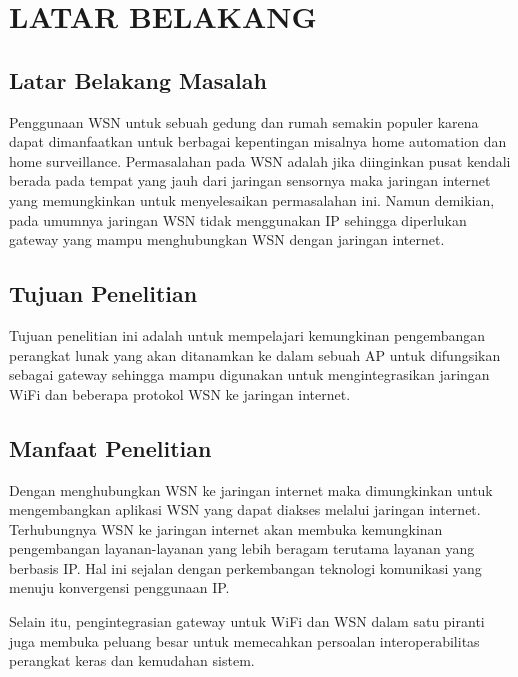 \documentclass{jtetiproposalskripsi}
\begin{document}
\tableofcontents
{}
\clearpage{}\setcounter{page}{1}

\chapter{LATAR BELAKANG}

\section{Latar Belakang Masalah}
Penggunaan WSN untuk sebuah gedung dan rumah semakin populer karena dapat dimanfaatkan untuk berbagai kepentingan misalnya home automation dan home surveillance. Permasalahan pada WSN adalah jika diinginkan pusat kendali berada pada tempat yang jauh dari jaringan sensornya maka jaringan internet yang memungkinkan untuk menyelesaikan permasalahan ini. Namun demikian, pada umumnya jaringan WSN tidak menggunakan IP sehingga diperlukan gateway yang mampu menghubungkan WSN dengan jaringan internet.

\section{Tujuan Penelitian}
Tujuan penelitian ini adalah untuk mempelajari kemungkinan pengembangan perangkat lunak yang akan ditanamkan ke dalam sebuah AP untuk difungsikan sebagai gateway sehingga mampu digunakan untuk mengintegrasikan jaringan WiFi dan beberapa protokol WSN ke jaringan internet.


\section{Manfaat Penelitian}
Dengan menghubungkan WSN ke jaringan internet maka dimungkinkan untuk mengembangkan aplikasi WSN yang dapat diakses melalui jaringan internet. Terhubungnya WSN ke jaringan internet akan membuka kemungkinan pengembangan layanan-layanan yang lebih beragam terutama layanan yang berbasis IP. Hal ini sejalan dengan perkembangan teknologi komunikasi yang menuju konvergensi penggunaan IP.

Selain itu, pengintegrasian gateway untuk WiFi dan WSN dalam satu piranti juga membuka peluang besar untuk memecahkan persoalan interoperabilitas perangkat keras dan kemudahan sistem.
\end{document}
